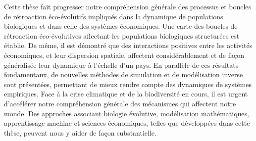 {Cette thèse fait progresser notre compréhension générale des processus et boucles de rétroaction éco-évolutifs impliqués dans la dynamique de populations biologiques et dans celle des systèmes économiques. Une carte des boucles de rétroaction éco-évolutives affectant les populations biologiques structurées est établie. De même, il est démontré que des interactions positives entre les activités économiques, et leur dispersion spatiale, affectent considérablement et de façon généralisée leur dynamique à l'échelle d'un pays. En parallèle de ces résultats fondamentaux, de nouvelles méthodes de simulation et de modélisation inverse sont présentées, permettant de mieux rendre compte des dynamiques de systèmes empiriques. Face à la crise climatique et de la biodiversité en cours, il est urgent d'accélérer notre compréhension générale des mécanismes qui affectent notre monde. Des approches associant biologie évolutive, modélisation mathématiques, apprentissage machine et sciences économiques, telles que développées dans cette thèse, peuvent nous y aider de façon substantielle.}

